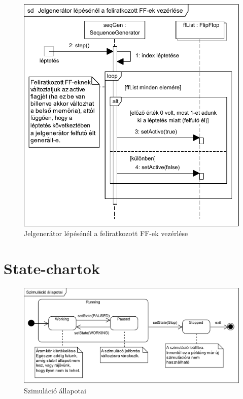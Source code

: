 \begin{figure}[H]
\begin{center}
\includegraphics{chapters/chapter03/seqdiagrams/ff_vez_on_clk.pdf}
\caption{Jelgenerátor lépésénél a feliratkozott FF-ek vezérlése}
\label{fig:ff_vez_on_clk}
\end{center}
\end{figure}

\section{State-chartok}

\begin{figure}[h]
\begin{center}
\includegraphics[width=17cm]{chapters/chapter03/seqdiagrams/sim_states.pdf}
\caption{Szimuláció állapotai}
\label{fig:sim_states}
\end{center}
\end{figure}
